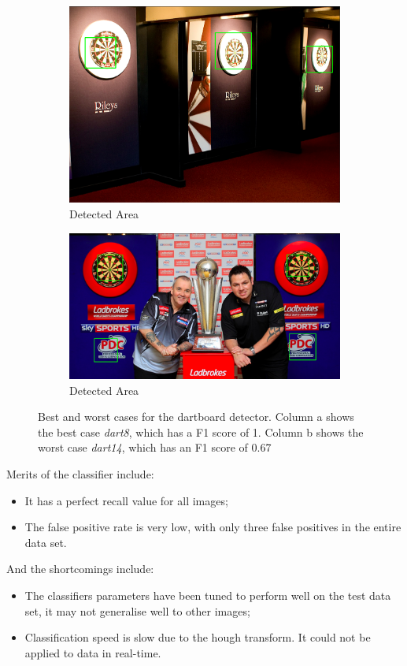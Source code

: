 \documentclass[conference]{IEEEtran}
\begin{document}
\begin{figure}[htb]
\begin{subfigure}{.5\linewidth}
\vspace{0.3cm}
  \centering
  \includegraphics[width=.9\linewidth]{images/task3/bestresult.png}
  \caption{Detected Area}
  \label{fig:sub1}
\end{subfigure}%
\begin{subfigure}{.5\linewidth}
\vspace{1.1cm}
  \centering
  \includegraphics[width=.9\linewidth]{images/task3/worstresult.png}
  \caption{Detected Area}
  \label{fig:sub2}
\end{subfigure}
\caption{Best and worst cases for the dartboard detector. Column a shows the best case \emph{dart8}, which has a F1 score of 1.  Column b shows the worst case \emph{dart14}, which has an F1 score of 0.67}
\end{figure}


\newpage
Merits of the classifier include: 
\begin{itemize}
	\item It has a perfect recall value for all images;
	\item The false positive rate is very low, with only three false positives in the entire data set.
\end{itemize}
And the shortcomings include:
\begin{itemize}
	\item The classifiers parameters have been tuned to perform well on the test data set, it may not generalise well to other images;
	\item Classification speed is slow due to the hough transform. It could not be applied to data in real-time. 
\end{itemize}
\end{document}
